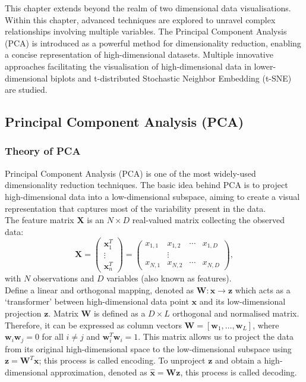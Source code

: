 \documentclass{article}\usepackage[]{graphicx}\usepackage[]{xcolor}
\numberwithin{equation}{section}
\begin{document}
{\noindent This  chapter extends beyond the realm of two dimensional data visualisations. Within this chapter, advanced techniques are explored to unravel complex relationships involving multiple variables. The Principal Component Analysis (PCA) is introduced as a powerful method for dimensionality reduction, enabling a concise representation of high-dimensional datasets. Multiple innovative approaches facilitating the visualisation of high-dimensional data in lower-dimensional biplots and t-distributed Stochastic Neighbor Embedding (t-SNE) are studied. 

\subsection{Principal Component Analysis (PCA)}

\subsubsection{Theory of PCA}
\noindent
Principal Component Analysis (PCA) is one of the most widely-used dimensionality reduction techniques. The basic idea behind PCA is to project high-dimensional data into a low-dimensional subspace, aiming to create a visual representation that captures most of the variability present in the data.\\

\noindent
The feature matrix $\mathbf{X}$ is an $N \times D$ real-valued matrix collecting the observed data:
$$\mathbf{X} = \left( \begin{array}{ccc}
    \mathbf{x}^{T}_{1}\\
    \vdots\\
    \mathbf{x}^{T}_{n}
    \end{array} \right) = \begin{pmatrix}
x_{1,1} & x_{1,2} & \cdots & x_{1,D} \\
 &\vdots & & \\
x_{N,1} & x_{N,2} & \cdots & x_{N,D}
\end{pmatrix},$$
\noindent
with $N$ observations and $D$ variables (also known as features).\\

\noindent
Define a linear and orthogonal mapping, denoted as $\mathbf{W}: \mathbf{x} \to \mathbf{z}$ which acts as a `transformer' between high-dimensional data point $\mathbf{x}$ and its low-dimensional projection $\mathbf{z}$. Matrix $\mathbf{W}$ is defined as a $D \times L$ orthogonal and normalised matrix. Therefore, it can be expressed as column vectors $\mathbf{W} = [\mathbf{w}_1, \dots, \mathbf{w}_L]$, where $\mathbf{w}_i \mathbf{w}_j = 0$ for all $i \ne j$ and $\mathbf{w}_i^T \mathbf{w}_i = 1$. This matrix allows us to project the data from its original high-dimensional space to the low-dimensional subspace using $\mathbf{z} = \mathbf{W}^T\mathbf{x}$; this process is called encoding. To unproject $\mathbf{z}$ and obtain a high-dimensional approximation, denoted as $\hat{\mathbf{x}} = \mathbf{W}\mathbf{z}$, this process is called decoding.\\

}
\end{document}
